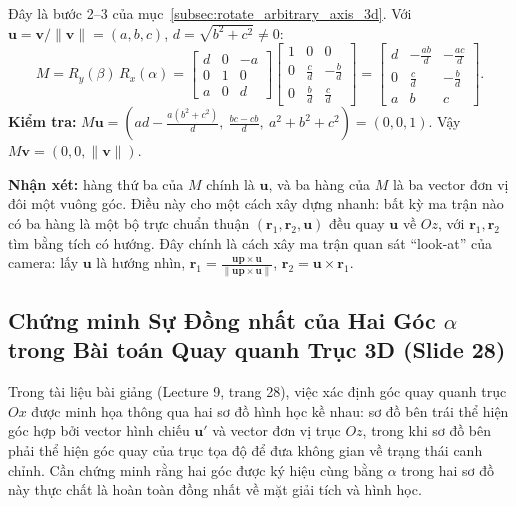 Đây là bước 2--3 của mục~\ref{subsec:rotate_arbitrary_axis_3d}. Với $\mathbf{u} = \mathbf{v}/\|\mathbf{v}\| = (a, b, c)$, $d = \sqrt{b^2 + c^2} \ne 0$:
\begin{equation}
M = R_y(\beta)\,R_x(\alpha) =
\begin{bmatrix} d & 0 & -a \\ 0 & 1 & 0 \\ a & 0 & d \end{bmatrix}
\begin{bmatrix} 1 & 0 & 0 \\ 0 & \frac{c}{d} & -\frac{b}{d} \\ 0 & \frac{b}{d} & \frac{c}{d} \end{bmatrix}
= \begin{bmatrix} d & -\frac{ab}{d} & -\frac{ac}{d} \\ 0 & \frac{c}{d} & -\frac{b}{d} \\ a & b & c \end{bmatrix}.
\end{equation}
\textbf{Kiểm tra:} $M\mathbf{u} = \left(ad - \frac{a(b^2 + c^2)}{d},\ \frac{bc - cb}{d},\ a^2 + b^2 + c^2\right) = (0, 0, 1)$. Vậy $M\mathbf{v} = (0, 0, \|\mathbf{v}\|)$.

\textbf{Nhận xét:} hàng thứ ba của $M$ chính là $\mathbf{u}$, và ba hàng của $M$ là ba vector đơn vị đôi một vuông góc. Điều này cho một cách xây dựng nhanh: bất kỳ ma trận nào có ba hàng là một bộ trực chuẩn thuận $(\mathbf{r}_1, \mathbf{r}_2, \mathbf{u})$ đều quay $\mathbf{u}$ về $Oz$, với $\mathbf{r}_1, \mathbf{r}_2$ tìm bằng tích có hướng. Đây chính là cách xây ma trận quan sát ``look-at'' của camera: lấy $\mathbf{u}$ là hướng nhìn, $\mathbf{r}_1 = \frac{\mathbf{up}\times\mathbf{u}}{\|\mathbf{up}\times\mathbf{u}\|}$, $\mathbf{r}_2 = \mathbf{u}\times\mathbf{r}_1$.

\subsection{Chứng minh Sự Đồng nhất của Hai Góc \texorpdfstring{$\alpha$}{alpha} trong Bài toán Quay quanh Trục 3D (Slide 28)}
\label{subsec:proof_alpha_angles_identical}

Trong tài liệu bài giảng (Lecture 9, trang 28), việc xác định góc quay quanh trục $Ox$ được minh họa thông qua hai sơ đồ hình học kề nhau: sơ đồ bên trái thể hiện góc hợp bởi vector hình chiếu $\mathbf{u}'$ và vector đơn vị trục $Oz$, trong khi sơ đồ bên phải thể hiện góc quay của trục tọa độ để đưa không gian về trạng thái canh chỉnh. Cần chứng minh rằng hai góc được ký hiệu cùng bằng $\alpha$ trong hai sơ đồ này thực chất là hoàn toàn đồng nhất về mặt giải tích và hình học.

